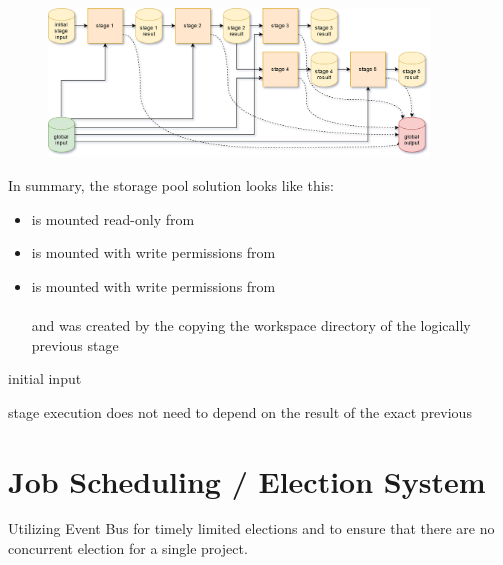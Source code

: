 \begin{figure}[H]
	\centering
	\includegraphics[width=0.9\textwidth]{stage-storage.png}
\end{figure}

In summary, the storage pool solution looks like this:

\begin{itemize}
	\item {} is mounted read-only from \\ 
	\item {} is mounted with write permissions from \\ 
	\item {} is mounted with write permissions from \\  \\
	and was created by the copying the workspace directory of the logically previous stage
\end{itemize}




initial input

stage execution does not need to depend on the result of the exact previous



\section{Job Scheduling / Election System}
\label{design:election}
\label{election:affinity_and_aversion} 


Utilizing Event Bus for timely limited elections and to ensure that there are no concurrent election for a single project.


